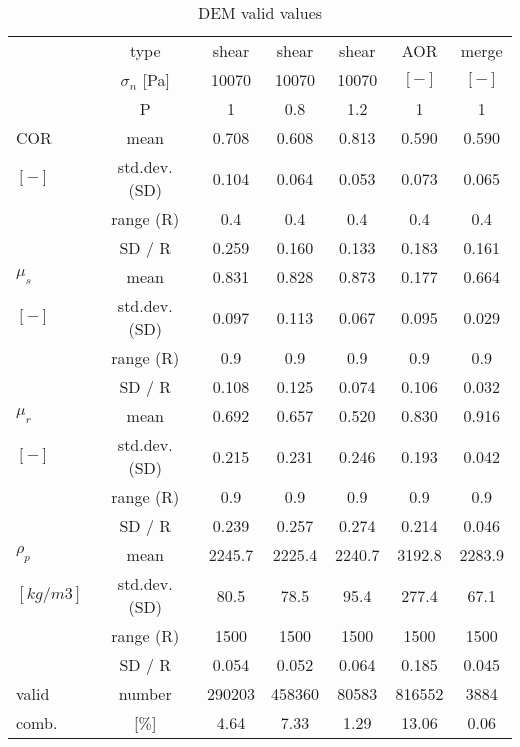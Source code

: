 \begin{table}[h]
\centering
\begin{tabular}{lcccccc}
\hline

          & type  & shear & shear & shear & AOR   & merge \\
          & $\sigma_n$ [Pa] & 10070 & 10070 & 10070 & $[-]$ & $[-]$ \\
          & P     & 1     & 0.8   & 1.2   & 1     & 1 \\
          \hline
    COR   & mean  & 0.708 & 0.608 & 0.813 & 0.590 & 0.590 \\
   $ [-] $  & std.dev. (SD) & 0.104 & 0.064 & 0.053 & 0.073 & 0.065 \\
          & range (R) & 0.4   & 0.4   & 0.4   & 0.4   & 0.4 \\
          & SD / R & 0.259 & 0.160 & 0.133 & 0.183 & 0.161 \\

    $\mu_s$ & mean  & 0.831 & 0.828 & 0.873 & 0.177 & 0.664 \\
    $ [-] $  & std.dev. (SD) & 0.097 & 0.113 & 0.067 & 0.095 & 0.029 \\
          & range (R) & 0.9   & 0.9   & 0.9   & 0.9   & 0.9 \\
          & SD / R & 0.108 & 0.125 & 0.074 & 0.106 & 0.032 \\

    $\mu_r$ & mean  & 0.692 & 0.657 & 0.520 & 0.830 & 0.916 \\
	$[-]  $ & std.dev. (SD) & 0.215 & 0.231 & 0.246 & 0.193 & 0.042 \\
          & range (R) & 0.9   & 0.9   & 0.9   & 0.9   & 0.9 \\
          & SD / R & 0.239 & 0.257 & 0.274 & 0.214 & 0.046 \\

    $\rho_p$ & mean  & 2245.7 & 2225.4 & 2240.7 & 3192.8 & 2283.9 \\
	$[kg/m3] $  & std.dev. (SD) & 80.5  & 78.5  & 95.4  & 277.4 & 67.1 \\
          & range (R) & 1500  & 1500  & 1500  & 1500  & 1500 \\
          & SD / R & 0.054 & 0.052 & 0.064 & 0.185 & 0.045 \\

    valid & number & 290203 & 458360 & 80583 & 816552 & 3884 \\
    comb. & [$\%$] & 4.64  & 7.33  & 1.29  & 13.06 & 0.06 \\

    

\hline
\end{tabular}
\caption{DEM valid values}
\label{tab:13DEMvalidvalues}
\end{table}